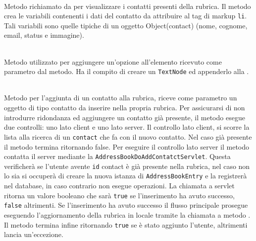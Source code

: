 \begin{description}
	\item{}\\

Metodo richiamato da  per visualizzare i contatti presenti della rubrica. Il metodo crea le variabili contenenti i dati del contatto da attribuire al tag di markup \texttt{li}. Tali variabili sono quelle tipiche di un oggetto Object(contact) (nome, cognome, email, status e immagine).


\item{}\\
Metodo utilizzato per aggiungere un'opzione all'elemento  ricevuto come parametro dal metodo. Ha il compito di creare un \texttt{TextNode} ed appenderlo alla .

	
	\item{}\\
	Metodo per l'aggiunta di un contatto alla rubrica, riceve come parametro un oggetto di tipo contatto da inserire nella propria rubrica. 
Per assicurarsi di non introdurre ridondanza ed aggiungere un contatto già presente, il metodo esegue due controlli: uno lato client e uno lato server. 
Il controllo lato client, si scorre la lista  alla ricerca di un \texttt{contact} che fa  con il nuovo contatto. Nel caso già presente il metodo termina ritornando false. Per eseguire il controllo lato server il metodo contatta il server mediante la  \texttt{AddressBookDoAddContatctServlet}. Questa verificherà se l'utente avente \texttt{id} contact è già presente nella rubrica, nel caso non lo sia  si occuperà di creare la nuova istanza di \texttt{AddressBookEntry} e la registrerà nel database, in caso contrario non esegue operazioni. 
La chiamata a servlet ritorna un valore booleano che sarà \texttt{true} se l'inserimento ha avuto successo, \texttt{false} altrimenti. 
Se l'inserimento ha avuto successo il flusso principale prosegue eseguendo l'aggiornamento della rubrica in locale tramite la chiamata a metodo . Il metodo termina infine ritornando \texttt{true} se è stato aggiunto l'utente, altrimenti lancia un'eccezione.


\end{description}

